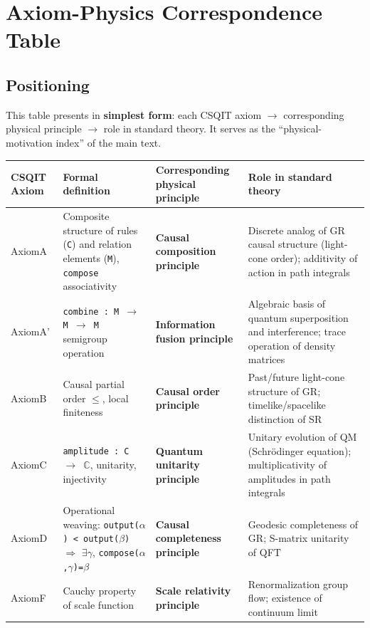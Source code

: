 \documentclass[aps,prd,twocolumn,nofootinbib,floatfix]{revtex4-2}
\begin{document}
\section{Axiom-Physics Correspondence Table}

\subsection{Positioning}

This table presents in \textbf{simplest form}: each CSQIT axiom $\to$ corresponding physical principle $\to$ role in standard theory. It serves as the ``physical-motivation index'' of the main text.

\begin{table}[h]
\centering
\small
\begin{tabular}{|p{1.5cm}|p{3.5cm}|p{3.5cm}|p{4cm}|}
\hline
\textbf{CSQIT Axiom} & \textbf{Formal definition} & \textbf{Corresponding physical principle} & \textbf{Role in standard theory} \\
\hline
AxiomA & Composite structure of rules (\texttt{C}) and relation elements (\texttt{M}), \texttt{compose} associativity & \textbf{Causal composition principle} & Discrete analog of GR causal structure (light-cone order); additivity of action in path integrals \\
\hline
AxiomA' & \texttt{combine : M $\to$ M $\to$ M} semigroup operation & \textbf{Information fusion principle} & Algebraic basis of quantum superposition and interference; trace operation of density matrices \\
\hline
AxiomB & Causal partial order \texttt{$\leq$}, local finiteness & \textbf{Causal order principle} & Past/future light-cone structure of GR; timelike/spacelike distinction of SR \\
\hline
AxiomC & \texttt{amplitude : C $\to$ $\mathbb{C}$}, unitarity, injectivity & \textbf{Quantum unitarity principle} & Unitary evolution of QM (Schr\"odinger equation); multiplicativity of amplitudes in path integrals \\
\hline
AxiomD & Operational weaving: \texttt{output($\alpha$) < output($\beta$)} $\Rightarrow$ $\exists\gamma$, \texttt{compose($\alpha$,$\gamma$)=$\beta$} & \textbf{Causal completeness principle} & Geodesic completeness of GR; S-matrix unitarity of QFT \\
\hline
AxiomF & Cauchy property of scale function & \textbf{Scale relativity principle} & Renormalization group flow; existence of continuum limit \\

\end{tabular}
\end{table}
\end{document}

